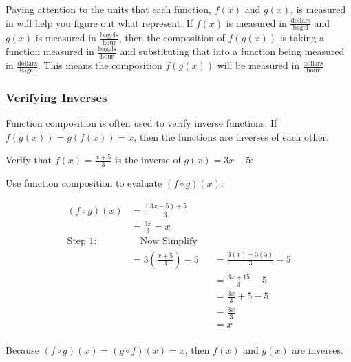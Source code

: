 Paying attention to the units that each function, $f(x)$ and $g(x)$, is measured
in will help you figure out what represent. If $f(x)$ is measured in
$\frac{\textrm{dollars}}{\textrm{bagel}}$ and $g(x)$ is measured in
$\frac{\textrm{bagels}}{\textrm{hour}}$, then the composition of $f(g(x))$ is taking a function
measured in $\frac{\textrm{bagels}}{\textrm{hour}}$ and substituting that into a
function being measured in $\frac{\textrm{dollars}}{\textrm{bagel}}$.
This means the composition $f(g(x))$ will be measured in
$\frac{\textrm{dollars}}{\textrm{hour}}$


\subsubsection{Verifying Inverses}
\label{sub_sub_sec:verifying_inverses}

Function composition is often used to verify inverse functions. If $f(g(x)) =
g(f(x)) = x$, then the functions are inverses of each other.

\begin{example}
  \label{exm:verifying_inverses}

  Verify that $f(x) = \frac{x + 5}{3}$ is the inverse of $g(x) = 3x - 5$:

  Use function composition to evaluate $(f \circ g)(x)$:

  \begin{equation}
    \label{eqt:verifying_inverses}
    \begin{alignedat}{3}
      (f \circ g)(x) &= \frac{(3x - 5) + 5}{3} && \\
                 &= \frac{3x}{3} = \boxed{x} && \\
      \textrm{Step 1:} \quad  & \quad \textrm{Now Simplify} && \\
                 &= 3(\frac{x + 5}{3}) - 5  &&= \frac{3(x) + 3(5)}{3} - 5 \\
                                          & &&= \frac{3x + 15}{3} - 5 \\
                                          & &&= \frac{3x}{3} + 5 - 5 \\
                                          & &&= \frac{3x}{3} \\
                                          & &&= \boxed{x} \\
    \end{alignedat}
  \end{equation}

  Because $(f \circ g)(x) = (g \circ f)(x) = x$, then $f(x)$ and $g(x)$ are
  inverses.
\end{example}


\newpage

